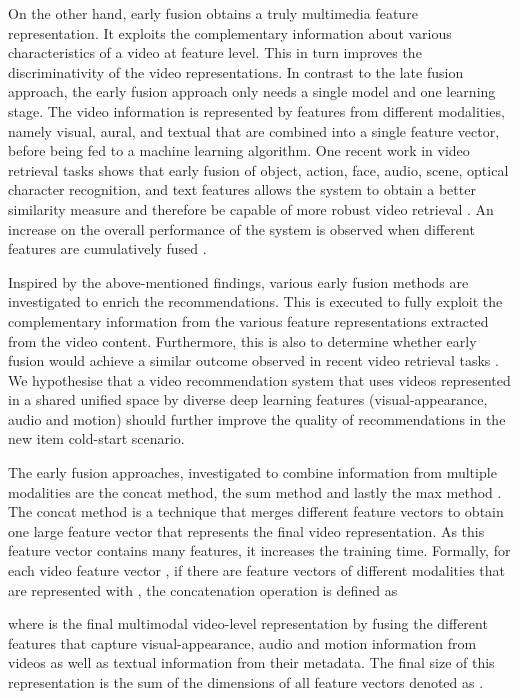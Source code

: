 \documentclass[review]{elsarticle}
\begin{document}
On the other hand, early fusion obtains a truly multimedia feature representation. It exploits the complementary information about various characteristics of a video at feature level. This in turn improves the discriminativity of the video representations. In contrast to the late fusion approach, the early fusion approach only needs a single model and one learning stage. The video information is represented by features from different modalities, namely visual, aural, and textual that are combined into a single feature vector, before being fed to a machine learning algorithm. One recent work in video retrieval tasks shows that early fusion of object, action, face, audio, scene, optical character recognition, and text features allows the system to obtain a better similarity measure and therefore be capable of more robust video retrieval \citep{liu2019use}. An increase on the overall performance of the system is observed when different features are cumulatively fused \citep{liu2019use}. 

Inspired by the above-mentioned findings, various early fusion methods are investigated to enrich the recommendations. This is executed to fully exploit the complementary information from the various feature representations extracted from the video content. Furthermore, this is also to determine whether early fusion would achieve a similar outcome observed in recent video retrieval tasks \citep{liu2019use,miech2019howto100m}. We hypothesise that a video recommendation system that uses videos represented in a shared unified space by diverse deep learning features (visual-appearance, audio and motion) should further improve the quality of recommendations in the new item cold-start scenario. 

The early fusion approaches, investigated to combine information from multiple modalities are the \ac{concat} method, the \ac{sum} method and lastly the \ac{max} method \citep{kalliatakis2019exploring}. The concat method is a technique that merges different feature vectors to obtain one large feature vector that represents the final video representation. As this feature vector contains many features, it increases the training time. Formally, for each video feature vector , if there are  feature vectors of different modalities that are represented with , the concatenation operation is defined as





\noindent where  is the final multimodal video-level representation by fusing the different features that capture visual-appearance, audio and motion information from videos as well as textual information from their metadata. The final size of this representation is the sum of the dimensions of all feature vectors denoted as .
\end{document}
